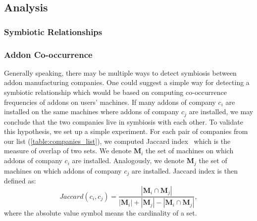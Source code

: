 \documentclass[ijoc,nonblindrev]{informs3} %
\numberwithin{equation}{subsection}
\begin{document}

\subsection{Analysis}
\subsubsection{Symbiotic Relationships}
\label{sec:symb_relations}

\subsubsection{Addon Co-occurrence}
\label{subsub:co_occurrence}

Generally speaking, there may be multiple ways to detect symbiosis between addon manufacturing companies. One could suggest a simple way for detecting a symbiotic relationship which would be based on computing co-occurrence frequencies of addons on users' machines. If many addons of company $c_i$ are installed on the same machines where addons of company $c_j$ are installed, we may conclude that the two companies live in symbiosis with each other. To validate this hypothesis, we set up a simple experiment. For each pair of companies from our list (\autoref{table:companies_list}), we computed Jaccard index~\citep{jaccard1912distribution} which is the measure of overlap of two sets. We denote $\mathbf{M}_i$ the set of machines on which addons of company $c_i$ are installed. Analogously, we denote $\mathbf{M}_j$ the set of machines on which addons of company $c_j$ are installed. Jaccard index is then defined as:
$$
Jaccard(c_i, c_j) = \frac{|\mathbf{M}_i \cap \mathbf{M}_j|}{|\mathbf{M}_i| + |\mathbf{M}_j| - |\mathbf{M}_i \cap \mathbf{M}_j|},
$$
where the absolute value symbol means the cardinality of a set.
\end{document}
